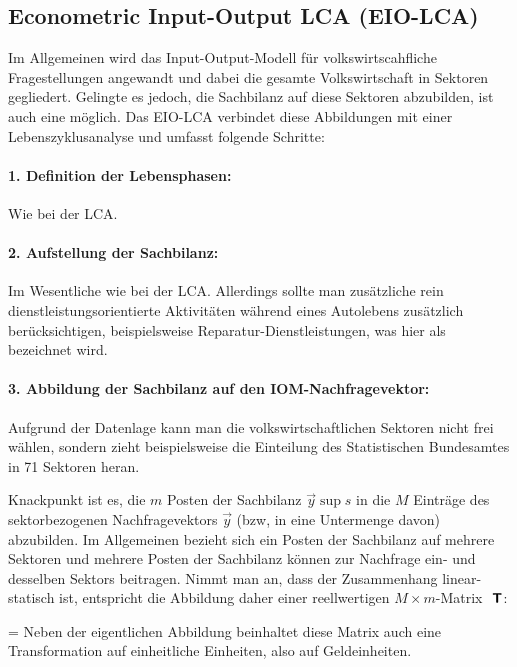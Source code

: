 \subsection{Econometric Input-Output LCA (EIO-LCA)}
\EinsteinBeg

Im Allgemeinen wird das Input-Output-Modell f\"ur volkswirtscahfliche
Fragestellungen angewandt und dabei die gesamte Volkswirtschaft in
Sektoren gegliedert. Gelingte es jedoch, die Sachbilanz auf diese
Sektoren abzubilden, ist auch eine  m\"oglich. Das EIO-LCA verbindet diese
Abbildungen mit einer Lebenszyklusanalyse und umfasst folgende
Schritte:

\paragraph{1. Definition der Lebensphasen:}  Wie bei der LCA.
\paragraph{2. Aufstellung der  Sachbilanz:} 
Im Wesentliche wie bei der LCA. Allerdings sollte man
zus\"atzliche rein dienstleistungsorientierte Aktivit\"aten w\"ahrend
eines Autolebens zus\"atzlich ber\"ucksichtigen, beispielsweise
Reparatur-Dienstleistungen, was hier als 
bezeichnet wird.

\paragraph{3. Abbildung der Sachbilanz auf den IOM-Nachfragevektor:}
Aufgrund der Datenlage kann man die volkswirtschaftlichen Sektoren
nicht frei w\"ahlen, sondern zieht beispielsweise die Einteilung des
Statistischen Bundesamtes in 71
Sektoren heran.

Knackpunkt ist es, die $m$ Posten der Sachbilanz $\vec{y}\sup{s}$ in die $M$ Eintr\"age
des sektorbezogenen Nachfragevektors $\vec{y}$ (bzw, in eine
Untermenge davon) abzubilden. Im
Allgemeinen bezieht sich  ein Posten der Sachbilanz auf mehrere
Sektoren und mehrere Posten der Sachbilanz k\"onnen zur Nachfrage
ein- und desselben Sektors beitragen. Nimmt man an, dass der
Zusammenhang linear-statisch ist, entspricht die Abbildung daher einer
reellwertigen $M\times m$-Matrix ${\mbox{ \sf\textbf{T}}}$:

\be
\label{y-EIO-LCA}
=\cdot {}
\ee
Neben der eigentlichen Abbildung beinhaltet diese Matrix auch eine
Transformation auf einheitliche Einheiten, also auf Geldeinheiten.

